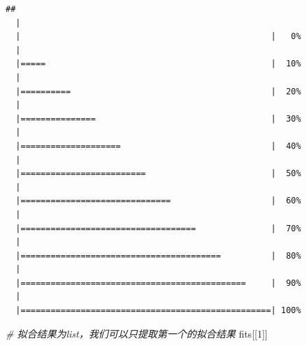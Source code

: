 \documentclass[]{krantz}
\makeatletter
\newenvironment{Shaded}{\begin{snugshade}}{\end{snugshade}}
\newcommand{\DecValTok}[1]{\textcolor[rgb]{0.00,0.00,0.81}{#1}}
\newcommand{\CommentTok}[1]{\textcolor[rgb]{0.56,0.35,0.01}{\textit{#1}}}
\newcommand{\NormalTok}[1]{#1}
\newenvironment{kframe}{%
\medskip{}
\setlength{\fboxsep}{.8em}
 \def\at@end@of@kframe{}%
 \ifinner\ifhmode%
  \def\at@end@of@kframe{\end{minipage}}%
  \begin{minipage}{\columnwidth}%
 \fi\fi%
 \def\FrameCommand##1{\hskip\@totalleftmargin \hskip-\fboxsep
 \colorbox{shadecolor}{##1}\hskip-\fboxsep
     \hskip-\linewidth \hskip-\@totalleftmargin \hskip\columnwidth}%
 \MakeFramed {\advance\hsize-\width
   \@totalleftmargin\z@ \linewidth\hsize
   \@setminipage}}%
 {\par\unskip\endMakeFramed%
 \at@end@of@kframe}
\renewenvironment{Shaded}{\begin{kframe}}{\end{kframe}}
\theoremstyle{definition}
\theoremstyle{definition}
\theoremstyle{definition}
\theoremstyle{remark}
\makeatother
\begin{document}
\begin{verbatim}
## 
  |                                                        
  |                                                  |   0%
  |                                                        
  |=====                                             |  10%
  |                                                        
  |==========                                        |  20%
  |                                                        
  |===============                                   |  30%
  |                                                        
  |====================                              |  40%
  |                                                        
  |=========================                         |  50%
  |                                                        
  |==============================                    |  60%
  |                                                        
  |===================================               |  70%
  |                                                        
  |========================================          |  80%
  |                                                        
  |=============================================     |  90%
  |                                                        
  |==================================================| 100%
\end{verbatim}

\begin{Shaded}
\begin{Highlighting}[]
\CommentTok{# 拟合结果为list，我们可以只提取第一个的拟合结果}
\NormalTok{fits[[}\DecValTok{1}\NormalTok{]]}
\end{Highlighting}
\end{Shaded}
\end{document}

